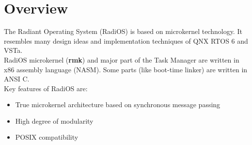 
\section{Overview}

The Radiant Operating System (RadiOS) is based on microkernel technology.
It resembles many design ideas and implementation techniques of QNX RTOS 6
and VSTa.
\\
RadiOS microkernel (\textbf{rmk}) and major part of the Task Manager are
written in x86 assembly language (NASM). Some parts (like boot-time linker)
are written in ANSI C.
\\
Key features of RadiOS are:
\begin{itemize}
\item True microkernel architecture based on synchronous message passing
\item High degree of modularity
\item POSIX compatibility
\end{itemize}
